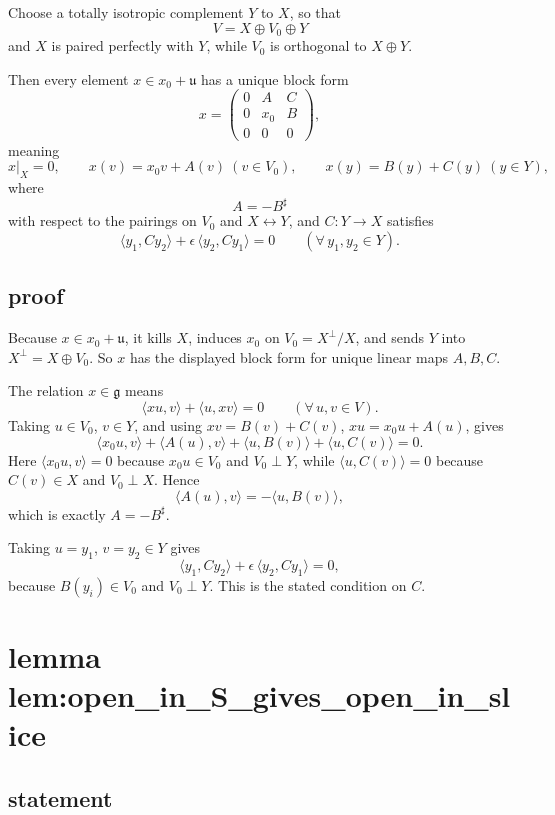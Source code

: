 \documentclass[
]{article}
\begin{document}
Choose a totally isotropic complement \(Y\) to \(X\), so that \[
V=X\oplus V_0\oplus Y
\] and \(X\) is paired perfectly with \(Y\), while \(V_0\) is orthogonal
to \(X\oplus Y\).

Then every element \(x\in x_0+\mathfrak u\) has a unique block form \[
x=
\begin{pmatrix}
0 & A & C\\
0 & x_0 & B\\
0 & 0 & 0
\end{pmatrix},
\] meaning \[
x|_X=0,\qquad
x(v)=x_0v+A(v)\ (v\in V_0),\qquad
x(y)=B(y)+C(y)\ (y\in Y),
\] where \[
A=-B^\sharp
\] with respect to the pairings on \(V_0\) and \(X\leftrightarrow Y\),
and \(C:Y\to X\) satisfies \[
\langle y_1,Cy_2\rangle+\epsilon\,\langle y_2,Cy_1\rangle=0
\qquad(\forall\,y_1,y_2\in Y).
\]

\subsection{proof}\label{proof-2}

Because \(x\in x_0+\mathfrak u\), it kills \(X\), induces \(x_0\) on
\(V_0=X^\perp/X\), and sends \(Y\) into \(X^\perp=X\oplus V_0\). So
\(x\) has the displayed block form for unique linear maps \(A,B,C\).

The relation \(x\in \mathfrak g\) means \[
\langle xu,v\rangle+\langle u,xv\rangle=0
\qquad(\forall\,u,v\in V).
\] Taking \(u\in V_0\), \(v\in Y\), and using \(xv=B(v)+C(v)\),
\(xu=x_0u+A(u)\), gives \[
\langle x_0u,v\rangle+\langle A(u),v\rangle+\langle u,B(v)\rangle+\langle u,C(v)\rangle=0.
\] Here \(\langle x_0u,v\rangle=0\) because \(x_0u\in V_0\) and
\(V_0\perp Y\), while \(\langle u,C(v)\rangle=0\) because \(C(v)\in X\)
and \(V_0\perp X\). Hence \[
\langle A(u),v\rangle=-\langle u,B(v)\rangle,
\] which is exactly \(A=-B^\sharp\).

Taking \(u=y_1\), \(v=y_2\in Y\) gives \[
\langle y_1,Cy_2\rangle+\epsilon\,\langle y_2,Cy_1\rangle=0,
\] because \(B(y_i)\in V_0\) and \(V_0\perp Y\). This is the stated
condition on \(C\).

\section{lemma
lem:open\_in\_S\_gives\_open\_in\_slice}\label{lemma-lemopen_in_s_gives_open_in_slice}

\subsection{statement}\label{statement-3}
\end{document}
